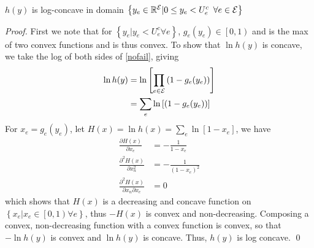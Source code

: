 \begin{lemma}
$h(y)$ is log-concave in domain $\left\{ y_e \in \R{\cE} | 0 \leq y_e < U^c_e \hspace{5px} \forall e \in \cE \right\}$
\end{lemma}
\begin{proof}
  First we note that for $\left\{ y_e | y_e < U^c_e \forall e \right\}$,  $g_e(y_e) \in \left[ 0, 1\right)$ and is the max of two convex functions and is thus convex. To show that $\ln h(y)$ is concave, we  take the log of both sides of \cref{nofail}, giving
\begin{align*}
\ln  h(y) & = \ln \left[ \prod_{e \in \mathcal{E}} \left( 1 - g_e(y_e) \right) \right] \\
&= \sum_e \ln \left[ \left( 1 - g_e(y_e) \right)\right]
\end{align*}
For $x_e = g_e(y_e)$, let $H(x) = \ln h(x) = \sum_e \ln \left[ 1- x_e \right]$, we have
\begin{align*}
\frac{\partial H(x)}{\partial x_e} &=  -\frac{1}{1-x_e}  \\
\frac{\partial^2 H(x)}{\partial x_n^2} &=  - \frac{1}{(1-x_e)^2} \\
\frac{\partial^2 H(x)}{\partial x_n \partial x_e} &=  0 
\end{align*}
which shows that $H(x)$ is a decreasing and concave function on $\left\{x_e | x_e \in \left[0,1\right) \forall e \right\}$, thus $-H(x)$ is convex and non-decreasing.  Composing a convex, non-decreasing function with a convex function is convex, so that $-\ln h(y)$ is convex and $\ln h(y)$ is concave.  Thus, $h(y)$ is log concave. \qed
\end{proof}


